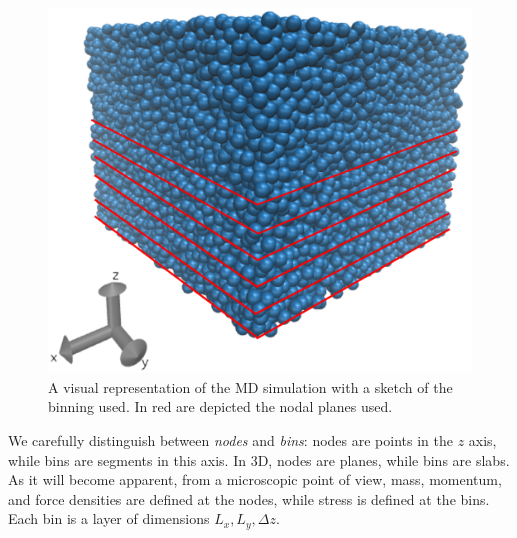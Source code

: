 \documentclass[a4paper,openright,12pt]{book}
\begin{document}
\begin{figure}
    \centering
    \includegraphics[scale=0.3]{system_nodes_periodic}
    \caption[Periodic box]{A visual representation of the MD simulation with a sketch of the binning used. In red are depicted the nodal planes used.}
    \label{fig:PBCBox}
\end{figure}
We carefully  distinguish between  \textit{nodes} and
\textit{bins}:  nodes are  points  in  the $z$  axis,  while bins  are
segments in this axis.  In 3D, nodes are planes, while bins are slabs.
As it  will become apparent, from  a microscopic point of  view, mass,
momentum, and force  densities are defined at the  nodes, while stress
is  defined  at  the  bins.   Each   bin  is  a  layer  of  dimensions
$L_x,L_y,\Delta z$. 
\end{document}
